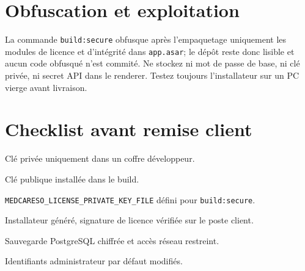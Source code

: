 \documentclass[11pt,a4paper]{article}
\begin{document}
\section{Obfuscation et exploitation}
La commande \texttt{build:secure} obfusque après l'empaquetage uniquement les
modules de licence et d'intégrité dans \texttt{app.asar}; le dépôt reste donc
lisible et aucun code obfusqué n'est commité. Ne stockez ni mot de passe de
base, ni clé privée, ni secret API dans le renderer. Testez toujours
l'installateur sur un PC vierge avant livraison.

\section*{Checklist avant remise client}
\begin{enumerate}[label={[\ ]}]
  \item Clé privée uniquement dans un coffre développeur.
  \item Clé publique installée dans le build.
  \item \texttt{MEDCARESO\_LICENSE\_PRIVATE\_KEY\_FILE} défini pour \texttt{build:secure}.
  \item Installateur généré, signature de licence vérifiée sur le poste client.
  \item Sauvegarde PostgreSQL chiffrée et accès réseau restreint.
  \item Identifiants administrateur par défaut modifiés.
\end{enumerate}
\end{document}
